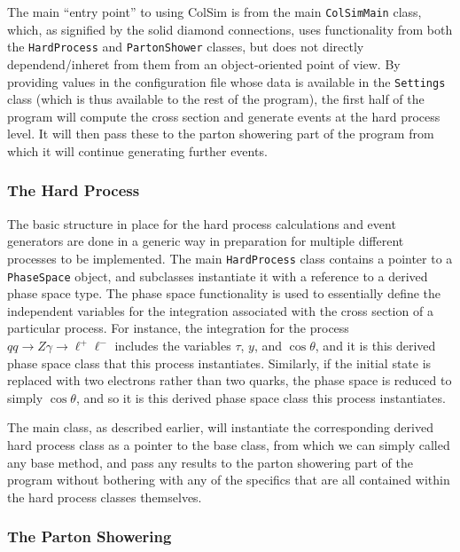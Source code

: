 \documentclass[titlepage]{article}
\begin{document}
The main ``entry point'' to using ColSim is from the main \texttt{ColSimMain} class, which, as signified by the solid diamond connections, uses functionality from both the \texttt{HardProcess} and \texttt{PartonShower} classes, but does not directly dependend/inheret from them from an object-oriented point of view. By providing values in the configuration file whose data is available in the \texttt{Settings} class (which is thus available to the rest of the program), the first half of the program will compute the cross section and generate events at the hard process level. It will then pass these to the parton showering part of the program from which it will continue generating further events. 

\subsubsection*{The Hard Process}

The basic structure in place for the hard process calculations and event generators are done in a generic way in preparation for multiple different processes to be implemented. The main \texttt{HardProcess} class contains a pointer to a \texttt{PhaseSpace} object, and subclasses instantiate it with a reference to a derived phase space type. The phase space functionality is used to essentially define the independent variables for the integration associated with the cross section of a particular process. For instance, the integration for the process $qq \rightarrow Z\gamma \rightarrow \ell^+\ell^-$ includes the variables $\tau$, $y$, and $\cos\theta$, and it is this derived phase space class that this process instantiates. Similarly, if the initial state is replaced with two electrons rather than two quarks, the phase space is reduced to simply $\cos\theta$, and so it is this derived phase space class this process instantiates.

The main class, as described earlier, will instantiate the corresponding derived hard process class as a pointer to the base class, from which we can simply called any base method, and pass any results to the parton showering part of the program without bothering with any of the specifics that are all contained within the hard process classes themselves.

\subsubsection*{The Parton Showering}
\end{document}
